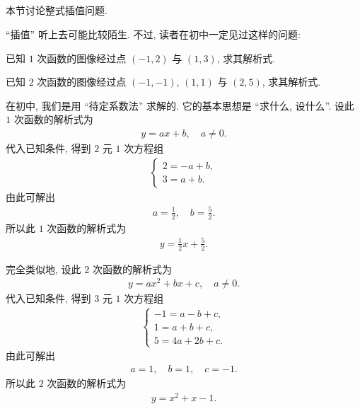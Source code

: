 \subsection*{\Interpolation}
\markright{\Interpolation}

本节讨论整式插值问题.

``插值'' 听上去可能比较陌生. 不过, 读者在初中一定见过这样的问题:

\begin{example}
    已知 $1$ 次函数的图像经过点 $(-1,2)$ 与 $(1,3)$, 求其解析式.
\end{example}

\begin{example}
    已知 $2$ 次函数的图像经过点 $(-1,-1)$, $(1,1)$ 与 $(2,5)$, 求其解析式.
\end{example}

在初中, 我们是用 ``待定系数法''  求解的. 它的基本思想是 ``求什么, 设什么''. 设此 $1$ 次函数的解析式为
\begin{align*}
    y = ax + b, \quad a \neq 0.
\end{align*}
代入已知条件, 得到 $2$ 元 $1$ 次方程组
\begin{align*}
    \begin{cases}
        2 = -a + b, \\
        3 = a + b.
    \end{cases}
\end{align*}
由此可解出
\begin{align*}
    a = \frac12, \quad b = \frac52.
\end{align*}
所以此 $1$ 次函数的解析式为
\begin{align*}
    y = \frac12 x + \frac52.
\end{align*}

完全类似地, 设此 $2$ 次函数的解析式为
\begin{align*}
    y = ax^2 + bx + c, \quad a \neq 0.
\end{align*}
代入已知条件, 得到 $3$ 元 $1$ 次方程组
\begin{align*}
    \begin{cases}
        -1 = a - b + c, \\
        1 = a + b + c,  \\
        5 = 4a + 2b + c.
    \end{cases}
\end{align*}
由此可解出
\begin{align*}
    a = 1, \quad b = 1, \quad c = -1.
\end{align*}
所以此 $2$ 次函数的解析式为
\begin{align*}
    y = x^2 + x - 1.
\end{align*}

